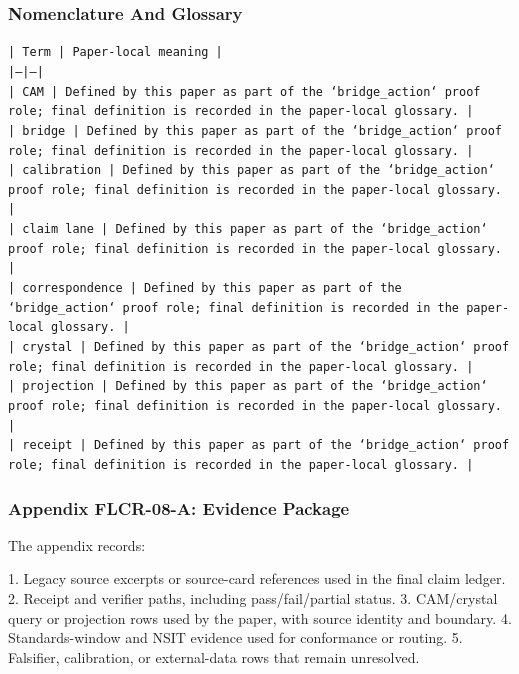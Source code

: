 \documentclass[11pt]{article}
\begin{document}
\subsubsection*{Nomenclature And Glossary}

\noindent\texttt{| Term | Paper-local meaning |}\\
\noindent\texttt{|---|---|}\\
\noindent\texttt{| CAM | Defined by this paper as part of the `bridge\_action` proof role; final definition is recorded in the paper-local glossary. |}\\
\noindent\texttt{| bridge | Defined by this paper as part of the `bridge\_action` proof role; final definition is recorded in the paper-local glossary. |}\\
\noindent\texttt{| calibration | Defined by this paper as part of the `bridge\_action` proof role; final definition is recorded in the paper-local glossary. |}\\
\noindent\texttt{| claim lane | Defined by this paper as part of the `bridge\_action` proof role; final definition is recorded in the paper-local glossary. |}\\
\noindent\texttt{| correspondence | Defined by this paper as part of the `bridge\_action` proof role; final definition is recorded in the paper-local glossary. |}\\
\noindent\texttt{| crystal | Defined by this paper as part of the `bridge\_action` proof role; final definition is recorded in the paper-local glossary. |}\\
\noindent\texttt{| projection | Defined by this paper as part of the `bridge\_action` proof role; final definition is recorded in the paper-local glossary. |}\\
\noindent\texttt{| receipt | Defined by this paper as part of the `bridge\_action` proof role; final definition is recorded in the paper-local glossary. |}\\

\subsubsection*{Appendix FLCR-08-A: Evidence Package}

The appendix records:

1. Legacy source excerpts or source-card references used in the final claim ledger.
2. Receipt and verifier paths, including pass/fail/partial status.
3. CAM/crystal query or projection rows used by the paper, with source identity and boundary.
4. Standards-window and NSIT evidence used for conformance or routing.
5. Falsifier, calibration, or external-data rows that remain unresolved.
\end{document}

